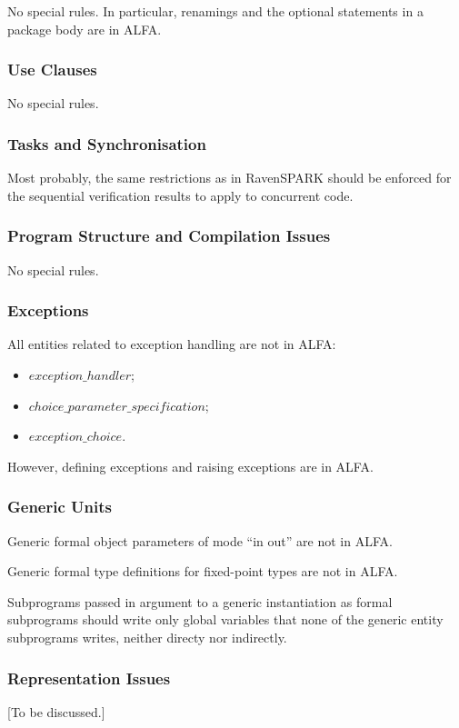 \documentclass{article}
\newcommand{\bnf}[1]{$\mathit{#1}$}
\begin{document}
No special rules. In particular, renamings and the optional statements in a
package body are in ALFA.

\subsubsection{Use Clauses}

No special rules.

\subsubsection{Tasks and Synchronisation}

Most probably, the same restrictions as in RavenSPARK should be enforced for
the sequential verification results to apply to concurrent code.

\subsubsection{Program Structure and Compilation Issues}

No special rules.

\subsubsection{Exceptions}

All entities related to exception handling are not in ALFA:
\begin{itemize}
\item \bnf{exception\_handler};
\item \bnf{choice\_parameter\_specification};
\item \bnf{exception\_choice}.
\end{itemize}

However, defining exceptions and raising exceptions are in ALFA.

\subsubsection{Generic Units}

Generic formal object parameters of mode ``in out'' are not in ALFA.

Generic formal type definitions for fixed-point types are not in ALFA.

Subprograms passed in argument to a generic instantiation as formal subprograms
should write only global variables that none of the generic entity subprograms
writes, neither directy nor indirectly.

\subsubsection{Representation Issues}

[To be discussed.]
\end{document}
